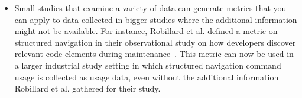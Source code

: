 \begin{itemize}
    \item Small studies that examine a variety of data can generate metrics that you can apply to data collected in bigger studies where the additional information might not be available. 
        For instance, Robillard et al. defined a metric on structured navigation in their observational study on how developers discover relevant code elements during maintenance~\cite{wbsnipes:Robillard2004How}. This metric can now be used in a larger industrial study setting in which structured navigation command usage is collected as usage data, even without the additional information Robillard et al. gathered for their study.
\end{itemize}

